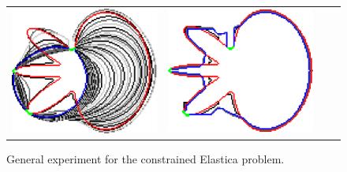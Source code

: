 \begin{figure}
\begin{tabular}{cccc}
\includegraphics[scale=0.2]{figures/chapter9/constrained-elastica/graphflow/flower-2/len_pen-0.0002/radius-7/N-1/h1.0/summary.pdf} &
\includegraphics[scale=0.2]{figures/chapter9/constrained-elastica/graphflow/flower-2/len_pen-0.0002/radius-50/N-1/h1.0/summary.pdf}\\


\end{tabular}
\caption{General experiment for the constrained Elastica problem.}
\label{fig:results-constrained-elastica-radius}
\end{figure}


